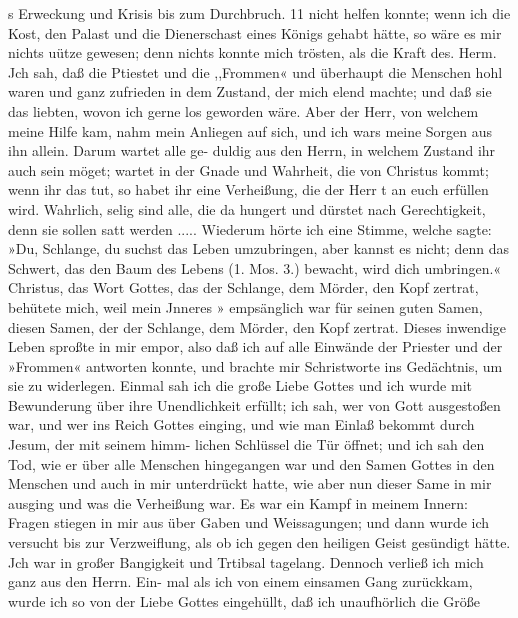 s Erweckung und Krisis bis zum Durchbruch. 11
nicht helfen konnte; wenn ich die Kost, den Palast und die
Dienerschast eines Königs gehabt hätte, so wäre es mir nichts
uütze gewesen; denn nichts konnte mich trösten, als die Kraft
des. Herm. Jch sah, daß die Ptiestet und die ,,Frommen«
und überhaupt die Menschen hohl waren und ganz zufrieden
in dem Zustand, der mich elend machte; und daß sie das
liebten, wovon ich gerne los geworden wäre. Aber der Herr,
von welchem meine Hilfe kam, nahm mein Anliegen auf sich, und
ich wars meine Sorgen aus ihn allein. Darum wartet alle ge-
duldig aus den Herrn, in welchem Zustand ihr auch sein möget;
wartet in der Gnade und Wahrheit, die von Christus kommt;
wenn ihr das tut, so habet ihr eine Verheißung, die der Herr t
an euch erfüllen wird. Wahrlich, selig sind alle, die da hungert
und dürstet nach Gerechtigkeit, denn sie sollen satt werden .....
Wiederum hörte ich eine Stimme, welche sagte: »Du, Schlange,
du suchst das Leben umzubringen, aber kannst es nicht; denn das
Schwert, das den Baum des Lebens (1. Mos. 3.) bewacht, wird
dich umbringen.« Christus, das Wort Gottes, das der Schlange,
dem Mörder, den Kopf zertrat, behütete mich, weil mein Jnneres »
empsänglich war für seinen guten Samen, diesen Samen, der der
Schlange, dem Mörder, den Kopf zertrat. Dieses inwendige
Leben sproßte in mir empor, also daß ich auf alle Einwände der
Priester und der »Frommen« antworten konnte, und brachte mir
Schristworte ins Gedächtnis, um sie zu widerlegen.
Einmal sah ich die große Liebe Gottes und ich wurde mit
Bewunderung über ihre Unendlichkeit erfüllt; ich sah, wer von
Gott ausgestoßen war, und wer ins Reich Gottes einging, und
wie man Einlaß bekommt durch Jesum, der mit seinem himm-
lichen Schlüssel die Tür öffnet; und ich sah den Tod, wie er
über alle Menschen hingegangen war und den Samen Gottes in
den Menschen und auch in mir unterdrückt hatte, wie aber nun
dieser Same in mir ausging und was die Verheißung war. Es
war ein Kampf in meinem Innern: Fragen stiegen in mir
aus über Gaben und Weissagungen; und dann wurde ich
versucht bis zur Verzweiflung, als ob ich gegen den heiligen Geist
gesündigt hätte. Jch war in großer Bangigkeit und Trtibsal
tagelang. Dennoch verließ ich mich ganz aus den Herrn. Ein-
mal als ich von einem einsamen Gang zurückkam, wurde ich so
von der Liebe Gottes eingehüllt, daß ich unaufhörlich die Größe


